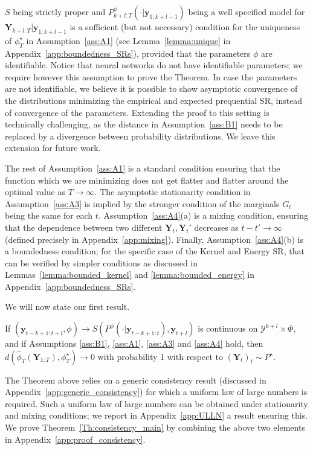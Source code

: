 \documentclass[twoside,11pt]{article}
\newcommand{\ddobs}{\mathbf{y}}
\newcommand{\Ddobs}{\mathbf{Y}}
\newcommand{\ddobsupkplusl}{\mathbf{y}_{1:k+l-1}}
\newcommand{\DdobsupT}{\mathbf{Y}_{1:T}}
\newcommand{\DdobsupTfromk}{\mathbf{Y}_{k+l:T}}
\begin{document}
	$ S $ being strictly proper and $ P^\phi_{k+l:T}(\cdot|\ddobsupkplusl) $ being a well specified model for $ \DdobsupTfromk|\ddobsupkplusl $ is a sufficient (but not necessary) condition for the uniqueness of $ \phi_T^\star $ in Assumption~\ref{ass:A1} (see Lemma~\ref{lemma:unique} in Appendix~\ref{app:boundedness_SRs}), provided that the parameters $ \phi $ are identifiable. Notice that neural networks do not have identifiable parameters; we require however this assumption to prove the Theorem. In case the parameters are not identifiable, we believe it is possible to show asymptotic convergence of the distributions minimizing the empirical and expected prequential SR, instead of convergence of the parameters. Extending the proof to this setting is technically challenging, as the distance in Assumption~\ref{ass:B1} needs to be replaced by a divergence between probability distributions. We leave this extension for future work.
	
	The rest of Assumption~\ref{ass:A1} is a standard condition ensuring that the function which we are minimizing does not get flatter and flatter around the optimal value as $ T\to\infty $. The asymptotic stationarity condition in Assumption~\ref{ass:A3} is implied by the stronger condition of the marginals $ G_t $ being the same for each $ t $.
	Assumption~\ref{ass:A4}(a) is a mixing condition, ensuring that the dependence between two  different $ \Ddobs_t,\Ddobs_t'  $ decreases as $ t-t'\to\infty $ (defined precisely in Appendix~\ref{app:mixing}). Finally, Assumption~\ref{ass:A4}(b) is a boundedness condition; for the specific case of the Kernel and Energy SR, that can be verified by simpler conditions as discussed in Lemmas~\ref{lemma:bounded_kernel} and \ref{lemma:bounded_energy} in Appendix~\ref{app:boundedness_SRs}.
	
	We will now state our first result.	
	\begin{theorem}\label{Th:consistency_main}
		If $ (\ddobs_{t-k+1:t+l}, \phi) \to S(P^\phi(\cdot|\ddobs_{t-k+1:t}), \ddobs_{t+l}) $ is continuous on $ \mathcal{Y}^{k+l} \times \Phi $, and if Assumptions \ref{ass:B1}, \ref{ass:A1}, \ref{ass:A3} and \ref{ass:A4} hold, then $ d(\hat \phi_T(\DdobsupT), \phi^\star_T) \to 0 $ with probability 1  with respect to $(\Ddobs_t)_t\sim P^\star $.
	\end{theorem}
	
	The Theorem above relies on a generic consistency result (discussed in Appendix~\ref{app:generic_consistency}) for which a uniform law of large numbers is required. Such a uniform law of large numbers can be obtained under stationarity and mixing conditions; we report in Appendix~\ref{app:ULLN} a result ensuring this. We prove Theorem~\ref{Th:consistency_main} by combining the above two elements in Appendix~\ref{app:proof_consistency}.
	
\end{document}

